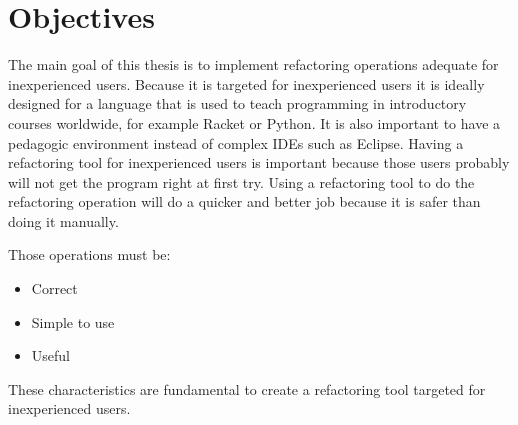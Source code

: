 
% 
% 

\section{Objectives}





The main goal of this thesis is to implement refactoring operations adequate for inexperienced users.
Because it is targeted for inexperienced users it is ideally designed for a language that is used to teach programming in introductory courses worldwide, for example Racket or Python.
It is also important to have a pedagogic environment instead of complex IDEs such as Eclipse.
Having a refactoring tool for inexperienced users is important because those users probably will not get the program right at first try.
Using a refactoring tool to do the refactoring operation will do a quicker and better job because it is safer than doing it manually.

Those operations must be:
\begin{itemize}
\item Correct
\item Simple to use
\item Useful
\end{itemize}

These characteristics are fundamental to create a refactoring tool targeted for inexperienced users.